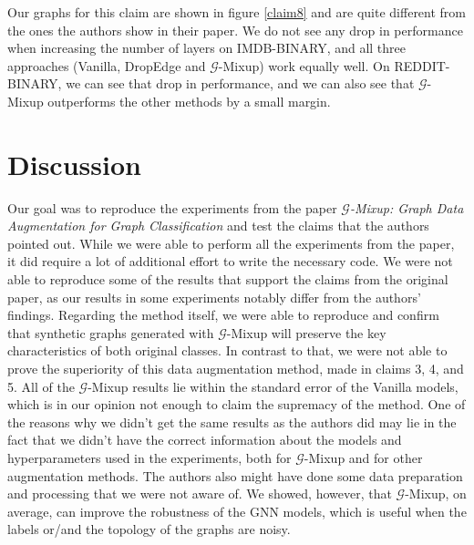 Our graphs for this claim are shown in figure \ref{claim8} and are quite different from the ones the authors show in their paper. We do not see any drop in performance when increasing the number of layers on IMDB-BINARY, and all three approaches (Vanilla, DropEdge and $\mathcal{G}$-Mixup) work equally well. On REDDIT-BINARY, we can see that drop in performance, and we can also see that $\mathcal{G}$-Mixup outperforms the other methods by a small margin.

\section{Discussion}


Our goal was to reproduce the experiments from the paper \textit{$\mathcal{G}$-Mixup: Graph Data Augmentation for Graph Classification} and test the claims that the authors pointed out. While we were able to perform all the experiments from the paper, it did require a lot of additional effort to write the necessary code. We were not able to reproduce some of the results that support the claims from the original paper, as our results in some experiments notably differ from the authors' findings. Regarding the method itself, we were able to reproduce and confirm that synthetic graphs generated with $\mathcal{G}$-Mixup will preserve the key characteristics of both original classes. In contrast to that, we were not able to prove the superiority of this data augmentation method, made in claims 3, 4, and 5. All of the $\mathcal{G}$-Mixup results lie within the standard error of the Vanilla models, which is in our opinion not enough to claim the supremacy of the method. One of the reasons why we didn't get the same results as the authors did may lie in the fact that we didn't have the correct information about the models and hyperparameters used in the experiments, both for $\mathcal{G}$-Mixup and for other augmentation methods. The authors also might have done some data preparation and processing that we were not aware of. We showed, however, that $\mathcal{G}$-Mixup, on average, can improve the robustness of the GNN models, which is useful when the labels or/and the topology of the graphs are noisy.  \\



